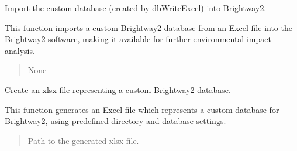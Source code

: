 \documentclass[letterpaper,10pt,english]{sphinxmanual}
\begin{document}
\begin{fulllineitems}
\label{\detokenize{WMFootprint_api:WasteAndMaterialFootprint.MakeCustomDatabase.dbExcel2BW}}
\pysigstartsignatures
{}
\pysigstopsignatures
\sphinxAtStartPar
Import the custom database (created by dbWriteExcel) into Brightway2.

\sphinxAtStartPar
This function imports a custom Brightway2 database from an Excel file into the Brightway2 software,
making it available for further environmental impact analysis.
\begin{quote}\begin{description}
\sphinxAtStartPar
None

\end{description}\end{quote}

\end{fulllineitems}


\begin{fulllineitems}
\label{\detokenize{WMFootprint_api:WasteAndMaterialFootprint.MakeCustomDatabase.dbWriteExcel}}
\pysigstartsignatures
{}
\pysigstopsignatures
\sphinxAtStartPar
Create an xlsx file representing a custom Brightway2 database.

\sphinxAtStartPar
This function generates an Excel file which represents a custom database for Brightway2,
using predefined directory and database settings.
\begin{quote}\begin{description}
\sphinxAtStartPar
Path to the generated xlsx file.

\end{description}\end{quote}

\end{fulllineitems}

\end{document}
